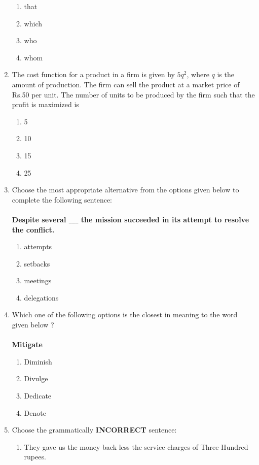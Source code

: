 \documentclass[journal]{IEEEtran}
\begin{document}
\begin{enumerate}
 \begin{enumerate}
     \item that
     \item which
     \item who
     \item whom \\
 \end{enumerate}
\item The cost function for a product in a firm is given by $5q^2$, where $q$ is the amount of production. The firm can sell the product at a market price of Rs.50 per unit. The number of units to be produced by the firm such that the profit is maximized is
\begin{enumerate}
   \item 5
   \item 10
   \item 15
   \item 25 \\
\end{enumerate}
\item Choose the most appropriate alternative from the options given below to complete the following sentence:\\\\
\textbf{Despite several $\_\_\_\_$ the mission succeeded in its attempt to resolve the conflict.}
\begin{enumerate}
    \item attempts
    \item setbacks
    \item meetings
    \item delegations \\
\end{enumerate}
\item Which one of the following options is the closest in meaning to the word given below ? \\\\
\textbf{Mitigate}
\begin{enumerate}
    \item Diminish
    \item Divulge
    \item Dedicate
    \item Denote \\
 \end{enumerate}
 \item Choose the grammatically \textbf{INCORRECT} sentence:
 \begin{enumerate}
    \item They gave us the money back less the service charges of Three Hundred rupees.

\end{enumerate}
\end{enumerate}
\end{document}
